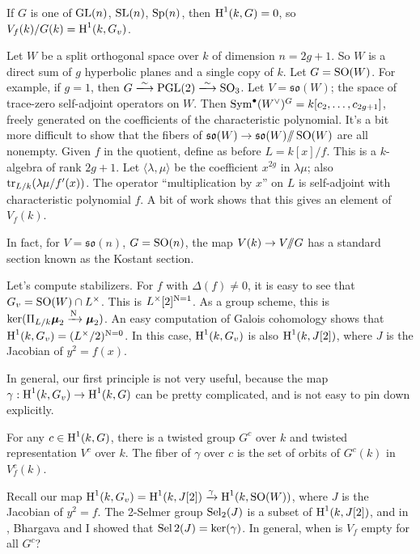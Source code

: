 If $G$ is one of $\operatorname{GL}(n)$, $\operatorname{SL}(n)$, $\operatorname{Sp}(n)$, 
then $\operatorname{H}^1(k,G)=0$, so $V_f(k)/G(k) = \operatorname{H}^1(k,G_v)$. 

\begin{example}
Let $W$ be a split orthogonal space over $k$ of dimension $n=2 g+1$. So $W$ 
is a direct sum of $g$ hyperbolic planes and a single copy of $k$. Let 
$G=\operatorname{SO}(W)$. For example, if 
$g=1$, then $G\iso \projectivegenerallinear(2)\iso \specialorthogonal_3$. 
Let $V=\mathfrak{so}(W)$; the space of trace-zero self-adjoint operators on 
$W$. Then 
$\operatorname{Sym}^\bullet(W^\vee)^G=k[c_2,\dots,c_{2g+1}]$, freely generated on 
the coefficients of the characteristic polynomial. It's a bit more 
difficult to show that the fibers of 
$\mathfrak{so}(W) \to \mathfrak{so}(W)/\!\!/ \operatorname{SO}(W)$ are all 
nonempty. Given $f$ in the quotient, define as before $L=k[x]/f$. This is a 
$k$-algebra of rank $2 g+1$. Let $\langle\lambda,\mu\rangle$ be the coefficient 
$x^{2 g}$ in $\lambda\mu$; also $\operatorname{tr}_{L/k}(\lambda\mu/f'(x))$. The 
operator ``multiplication by $x$'' on $L$ is self-adjoint with characteristic 
polynomial $f$. A bit of work shows that this gives an element of $V_f(k)$. 
\end{example}

In fact, for $V=\mathfrak{so}(n)$, $G=\operatorname{SO}(n)$, the map 
$V(k) \to V/\!\!/ G$ has a standard section known as the Kostant section. 

Let's compute stabilizers. For $f$ with $\Delta(f)\ne 0$, it is easy to see 
that $G_v=\operatorname{SO}(W)\cap L^\times$. This is 
$L^\times[2]^{\operatorname{N}=1}$. As a group scheme, this is 
$\ker(\Pi_{L/k}\boldsymbol\mu_2 \xrightarrow{\operatorname{N}{}}\boldsymbol\mu_2)$. 
An easy computation of Galois cohomology shows that 
$\operatorname{H}^1(k,G_v) = (L^\times/2)^{\operatorname{N}=0}$. In this case, $\operatorname{H}^1(k, G_v)$ is also 
$\operatorname{H}^1(k,J[2])$, where $J$ is the Jacobian of $y^2=f(x)$. 

In general, our first principle is not very useful, because the map 
$\gamma:\operatorname{H}^1(k,G_v) \to \operatorname{H}^1(k,G)$ can be pretty complicated, and is not easy to 
pin down explicitly. 

\begin{principle}
For any $c\in \operatorname{H}^1(k,G)$, there is a twisted group $G^c$ over $k$ and twisted 
representation $V^c$ over $k$. The fiber of $\gamma$ over $c$ is the set of 
orbits of $G^c(k)$ in $V_f^c(k)$. 
\end{principle}

Recall our map 
$\operatorname{H}^1(k,G_v) = \operatorname{H}^1(k,J[2]) \xrightarrow\gamma \operatorname{H}^1(k,\operatorname{SO}(W))$, 
where $J$ is the Jacobian of $y^2=f$. The 2-Selmer group $\operatorname{Sel}_2(J)$ is a 
subset of $\operatorname{H}^1(k,J[2])$, and in \cite{bg13}, Bhargava and I showed that 
$\operatorname{Sel}2(J) = \ker(\gamma)$. In general, when is $V_f$ empty for all 
$G^c$?

